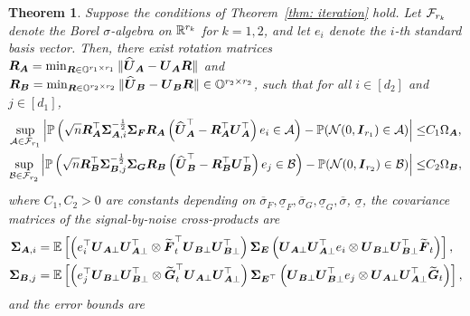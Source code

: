 \documentclass[11pt,letterpaper]{article}
\def\calA{{\cal  A}} \def\cA{{\cal  A}}
\def\calB{{\cal  B}} \def\cB{{\cal  B}}
\def\calF{{\cal  F}} \def\cF{{\cal  F}}
\newtheorem{theorem}{Theorem}[section]
\theoremstyle{definition}
\newcommand{\cano}[1]{\widetilde{\mathbf{#1}}}
\begin{document}
\begin{theorem}\label{thm: asymptotic normality}
Suppose the conditions of Theorem~\ref{thm: iteration} hold. %
Let $\calF_{r_k}$ denote the Borel $\sigma$-algebra on $\mathbb{R}^{r_k}$ for $k=1,2$, and let $e_i$ denote the $i$-th standard basis vector. Then, there exist rotation matrices $\boldsymbol{R}_{\boldsymbol{A}} = \min_{\boldsymbol{R} \in \mathbb{O}^{r_1 \times r_1}}\|\widehat{\boldsymbol{U}}_{\boldsymbol{A}} - \boldsymbol{U}_{\boldsymbol{A}}\boldsymbol{R}\|$ and $\boldsymbol{R}_{\boldsymbol{B}} = \min_{\boldsymbol{R} \in \mathbb{O}^{r_2 \times r_2}}\|\widehat{\boldsymbol{U}}_{\boldsymbol{B}} - \boldsymbol{U}_{\boldsymbol{B}}\boldsymbol{R}\| \in \mathbb{O}^{r_2 \times r_2}$, such that for all $i \in [d_2]$ and $j \in [d_1]$,
\begin{align}
\sup_{\calA \in \calF_{r_1}}\left|\PP\left(\sqrt{n} \bR_{\bA}^{\top}\bSigma_{\bA,i}^{-\frac{1}{2}} \bSigma_{\bF}\bR_{\bA}\left(\widehat{\bU}_{\bA}^{\top}- \bR_{\bA}^{\top}\bU_{\bA}^{\top}\right)e_i \in \calA\right) - \PP(\mathcal{N}(0, \bI_{r_1}) \in \calA)\right| 
\le & C_1\Omega_{\bA} ,     \label{eqn: asymp normality of UAei} \\
\sup_{\calB \in \calF_{r_2}}\left|\PP\left(\sqrt{n} \bR_{\bB}^{\top}\bSigma_{\bB,j}^{-\frac{1}{2}}  \bSigma_{\bG}\bR_{\bB}\left(\widehat{\bU}_{\bB}^{\top}- \bR_{\bB}^{\top}\bU_{\bB}^{\top}\right)e_j \in \calB\right) - \PP(\mathcal{N}(0, \bI_{r_2}) \in \calB)\right|
\le & C_2\Omega_{\bB},  \label{eqn: asymp normality of UBej}
\end{align}
where $C_1,C_2>0$ are constants depending on $\overline{\sigma}_{F}, \underline{\sigma}_{ F}, \overline{\sigma}_{G}, \underline{\sigma}_{G}, \overline{\sigma}$, $\underline{\sigma}$, the covariance matrices of the signal-by-noise cross-products are
\begin{align}
\bSigma_{\bA,i} &= \EE\left[\left(e_i^{\top}\bU_{\bA\perp}\bU_{\bA\perp}^{\top} \otimes\cano \bF_t^{\top} \bU_{\bB \perp}\bU_{\bB \perp}^{\top}\right) \bSigma_{\bE} \left(\bU_{\bA\perp}\bU_{\bA\perp}^{\top}e_i \otimes \bU_{\bB \perp} \bU_{\bB \perp}^{\top} \cano \bF_t\right)\right],    \label{eqn: Sigma_A}\\
\bSigma_{\bB,j} &=\EE\left[\left(e_j^{\top}\bU_{\bB\perp}\bU_{\bB\perp}^{\top} \otimes  \cano \bG_t^{\top} \bU_{\bA\perp}\bU_{\bA\perp}^{\top}\right) \bSigma_{\bE^{\top}} \left(\bU_{\bB\perp}\bU_{\bB\perp}^{\top}e_j \otimes \bU_{\bA\perp} \bU_{\bA\perp}^{\top} \cano \bG_t \right)\right],  \label{eqn: Sigma_B}
\end{align}
and the error bounds are
\begin{align*}

\end{align*}
\end{theorem}
\end{document}
